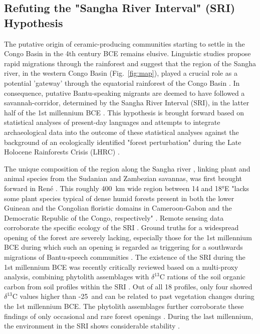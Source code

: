 \documentclass[smallextended,natbib]{svjour3}       %
\begin{document}
\subsection*{Refuting the "Sangha River Interval" (SRI) Hypothesis}

The putative origin of ceramic-producing communities starting to settle in the Congo Basin in the 4th century BCE remains elusive. Linguistic studies propose rapid migrations through the rainforest \citep{Currie.2013,Whiteley.2019,Koile.2022} and suggest that the region of the Sangha river, in the western Congo Basin (Fig.~\ref{fig:map}), played a crucial role as a potential 'gateway' through the equatorial rainforest of the Congo Basin \citep{Grollemund.2015,Bostoen.2015,Grollemund.2023}. In consequence, putative Bantu-speaking migrants are deemed to have followed a savannah-corridor, determined by the Sangha River Interval (SRI), in the latter half of the 1st millennium BCE \citep{Grollemund.2015,Bostoen.2015}. This hypothesis is brought forward based on statistical analyses of present-day languages and attempts to integrate archaeological data into the outcome of these statistical analyses against the background of an ecologically identified "forest perturbation" \citep[356]{Bostoen.2015} during the Late Holocene Rainforests Crisis (LHRC) \citep{Vincens.1994,Elenga.1996,Raynaud-Farrera.1996,Maley.1998b,Vincens.1998,Maley.2004,Ngomanda.2009,Sangen.2009,Giresse.2020}. 

The unique composition of the region along the Sangha river \citep[cf. "W\&E margins" in][7 Fig.~3A]{Philippon.2019}, linking plant and animal species from the Sudanian and Zambezian savannas, was first brought forward in René \citet{Letouzey.1968}. This roughly 400~km wide region between 14 and 18°E "lacks some plant species typical of dense humid forests present in both the lower Guinean and the Congolian floristic domains in Cameroon-Gabon and the Democratic Republic of the Congo, respectively" \citep[356]{Bostoen.2015}. Remote sensing data corroborate the specific ecology of the SRI \citep{Gond.2013,Philippon.2019}. Ground truths for a widespread opening of the forest are severely lacking, especially those for the 1st millennium BCE during which such an opening is regarded as triggering for a southwards migrations of Bantu-speech communities \citep{Grollemund.2015,Bostoen.2015}. The existence of the SRI during the 1st millennium BCE was recently critically reviewed based on a multi-proxy analysis, combining phytolith assemblages with $\delta^{13}$C rations of the soil organic carbon from soil profiles within the SRI \citep{Bremond.2017}. Out of all 18 profiles, only four showed $\delta^{13}$C values higher than -25\textperthousand\ and can be related to past vegetation changes during the 1st millennium BCE. The phytolith assemblages further corroborate these findings of only occasional and rare forest openings \citep[99]{Bremond.2017}. During the last millennium, the environment in the SRI shows considerable stability \citep{Giresse.2023}.
\end{document}
